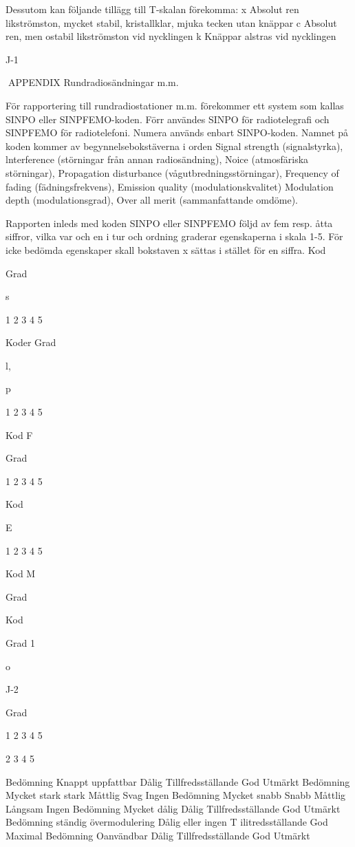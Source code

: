 Dessutom kan följande tillägg till T-skalan förekomma:
x Absolut ren likströmston, mycket stabil, kristallklar, mjuka tecken utan knäppar
c Absolut ren, men ostabil likströmston vid nycklingen
k Knäppar alstras vid nycklingen

J-1

APPENDIX
Rundradiosändningar m.m.

För rapportering till rundradiostationer m.m.
förekommer ett system som kallas SINPO
eller SINPFEMO-koden.
Förr användes SINPO för radiotelegrafi
och SINPFEMO för radiotelefoni. Numera
används enbart SINPO-koden.
Namnet på koden kommer av begynnelsebokstäverna i orden
Signal strength (signalstyrka),
lnterference (störningar från annan radiosändning),
Noice (atmosfäriska störningar),
Propagation disturbance (vågutbredningsstörningar),
Frequency of fading (fädningsfrekvens),
Emission quality (modulationskvalitet)
Modulation depth (modulationsgrad),
Over all merit (sammanfattande omdöme).

Rapporten inleds med koden SINPO eller
SINPFEMO följd av fem resp. åtta siffror,
vilka var och en i tur och ordning graderar
egenskaperna i skala 1-5. För icke bedömda
egenskaper skall bokstaven x sättas i stället
för en siffra.
Kod

Grad

s

1
2
3
4
5

Koder Grad

l,

p

1
2
3
4
5

Kod
F

Grad

1
2
3
4
5

Kod

E

1
2
3
4
5

Kod
M

Grad

Kod

Grad
1

o

J-2

Grad

1
2
3
4
5

2
3
4
5

Bedömning
Knappt uppfattbar
Dålig
Tillfredsställande
God
Utmärkt
Bedömning
Mycket stark
stark
Måttlig
Svag
Ingen
Bedömning
Mycket snabb
Snabb
Måttlig
Långsam
Ingen
Bedömning
Mycket dålig
Dålig
Tillfredsställande
God
Utmärkt
Bedömning
ständig övermodulering
Dålig eller ingen
T ilitredsställande
God
Maximal
Bedömning
Oanvändbar
Dålig
Tillfredsställande
God
Utmärkt

